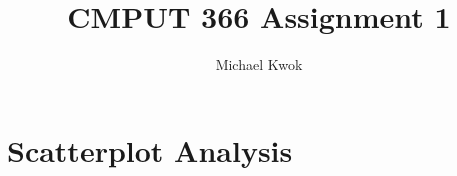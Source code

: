\documentclass{article}
\title{CMPUT 366 Assignment 1}
\author{Michael Kwok}
\begin{document}
\maketitle
\section*{Scatterplot Analysis}
\end{document}

